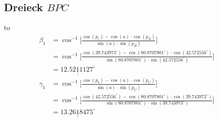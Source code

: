 \subsection{Dreieck $BPC$}
\vspace*{-4mm}
\hbox to
\begin{align*}
\beta_1 &= \cos^{-1}  \bigg[\frac{\cos(p_c)-\cos(a) \cdot \cos(p_B)}{\sin(a) \cdot \sin(p_B)}\bigg] \\
	&= \cos^{-1}  \bigg[\frac{\cos(39.743973^\circ)-\cos(80.8707801^\circ) \cdot \cos(42.572556^\circ)}{\sin(80.8707801^\circ) \cdot \sin(42.572556^\circ)}\bigg] \\
	&=\underline{\underline{12.5211127^\circ}} 
\\
\gamma_1 &= \cos^{-1}  \bigg[\frac{\cos(p_b)-\cos(a) \cdot \cos(p_C)}{\sin(a) \cdot \sin(p_C)}\bigg] \\
	&= \cos^{-1}  \bigg[\frac{\cos(42.572556^\circ)-\cos(80.8707801^\circ) \cdot \cos(39.743973^\circ)}{\sin(80.8707801^\circ) \cdot \sin(39.743973^\circ)}\bigg] \\
	&=\underline{\underline{13.2618475^\circ}} 
\end{align*}

